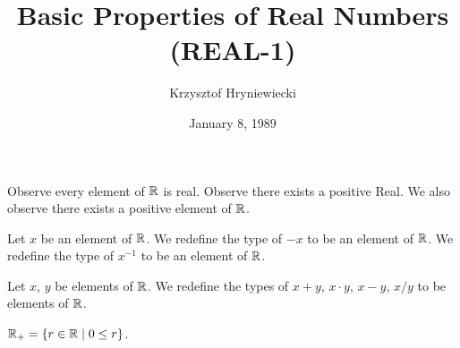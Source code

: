 \documentclass{article}
\title{Basic Properties of Real Numbers (REAL-1)}
\author{Krzysztof Hryniewiecki}
\date{January 8, 1989}
\begin{document}
\maketitle

Observe every element of $\mathbb{R}$ is real. Observe there exists a positive
Real. We also observe there exists a positive element of $\mathbb{R}$.

\begin{definition}
Let $x$ be an element of $\mathbb{R}$.
We redefine the type of $-x$ to be an element of $\mathbb{R}$.
We redefine the type of $x^{-1}$ to be an element of $\mathbb{R}$.
\end{definition}

\begin{definition}
Let $x$, $y$ be elements of $\mathbb{R}$.
We redefine the types of $x+y$, $x\cdot y$, $x-y$, $x/y$ to be elements
of $\mathbb{R}$.
\end{definition}

\begin{thm}
\item $\mathbb{R}_{+}=\{r\in\mathbb{R}\mid 0\leq r\}$.
\end{thm}
\end{document}

